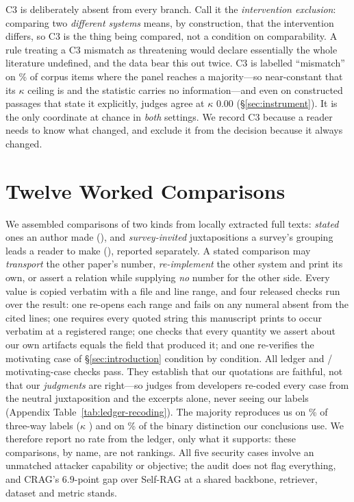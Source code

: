 \documentclass[11pt]{article}
\begin{document}
C3 is deliberately absent from every branch. Call it the \emph{intervention
exclusion}: comparing two \emph{different systems} means, by construction, that
the intervention differs, so C3 is the thing being compared, not a condition on
comparability. A rule treating a C3 mismatch as threatening would declare
essentially the whole literature undefined, and the data bear this out twice.
C3 is labelled ``mismatch'' on \CThreeMismatchMaj\% of corpus items where the
panel reaches a majority---so near-constant that its $\kappa$ ceiling is
\KmaxCThree{} and the statistic carries no information---and even on
constructed passages that state it explicitly, judges agree at $\kappa$ $0.00$
(\S\ref{sec:instrument}). It is the only coordinate at chance in \emph{both}
settings. We record C3 because a reader needs to know what changed, and exclude
it from the decision because it always changed.

\section{Twelve Worked Comparisons}
\label{sec:cases}

We assembled comparisons of two kinds from \FlowTexts{} locally extracted full
texts: \emph{stated} ones an author made (\LedgerStated{}), and
\emph{survey-invited} juxtapositions a survey's grouping leads a reader to make
(\LedgerInvited{}), reported separately. A stated comparison may
\emph{transport} the other paper's number, \emph{re-implement} the other system
and print its own, or assert a relation while supplying \emph{no} number for the
other side. Every value is copied verbatim with a file and line range, and four
released checks run over the result: one re-opens each range and fails on any
numeral absent from the cited lines; one requires every quoted string this
manuscript prints to occur verbatim at a registered range; one checks that every
quantity we assert about our own artifacts equals the field that produced it;
and one re-verifies the motivating case of \S\ref{sec:introduction} condition by
condition. All \VerifChecks{} ledger and \MotivPassed{}/\MotivChecks{}
motivating-case checks pass. They establish that our quotations are faithful,
not that our \emph{judgments} are right---so \RecJudges{} judges from
\RecDevs{} developers re-coded every case from the neutral juxtaposition and the
excerpts alone, never seeing our labels (Appendix
Table~\ref{tab:ledger-recoding}). The majority reproduces us on
\RecThreeWayPct\% of three-way labels ($\kappa$ \RecThreeWayK{}) and on
\RecBinaryPct\% of the binary distinction our conclusions use. We therefore
report no rate from the ledger, only what it supports: these comparisons, by
name, are not rankings. All five security cases involve an unmatched attacker
capability or objective; the audit does not flag everything, and CRAG's
$6.9$-point gap over Self-RAG at a shared backbone, retriever, dataset and
metric stands.
\end{document}
